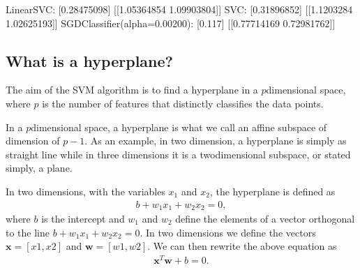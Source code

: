 \documentclass[letterpaper,10pt,english]{sphinxmanual}
\begin{document}
\begin{sphinxVerbatim}[commandchars=\\\{\}]
LinearSVC:                    [0.28475098] [[1.05364854 1.09903804]]
SVC:                          [0.31896852] [[1.1203284  1.02625193]]
SGDClassifier(alpha=0.00200): [0.117] [[0.77714169 0.72981762]]
\end{sphinxVerbatim}

\noindent{}


\subsection{What is a hyperplane?}
\label{\detokenize{chapter7:what-is-a-hyperplane}}
The aim of the SVM algorithm is to find a hyperplane in a
\(p\)\sphinxhyphen{}dimensional space, where \(p\) is the number of features that
distinctly classifies the data points.

In a \(p\)\sphinxhyphen{}dimensional space, a hyperplane is what we call an affine subspace of dimension of \(p-1\).
As an example, in two dimension, a hyperplane is simply as straight line while in three dimensions it is
a two\sphinxhyphen{}dimensional subspace, or stated simply, a plane.

In two dimensions, with the variables \(x_1\) and \(x_2\), the hyperplane is defined as
\begin{equation*}
\begin{split}
b+w_1x_1+w_2x_2=0,
\end{split}
\end{equation*}
where \(b\) is the intercept and \(w_1\) and \(w_2\) define the elements of a vector orthogonal to the line
\(b+w_1x_1+w_2x_2=0\).
In two dimensions we define the vectors \(\boldsymbol{x} =[x1,x2]\) and \(\boldsymbol{w}=[w1,w2]\).
We can then rewrite the above equation as
\begin{equation*}
\begin{split}
\boldsymbol{x}^T\boldsymbol{w}+b=0.
\end{split}
\end{equation*}
\end{document}
